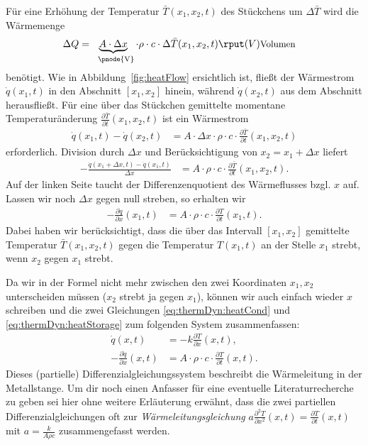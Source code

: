 \documentclass{article}
\def\pdx#1{\frac{\partial #1}{\partial x}}
\def\pdt#1{\frac{\partial #1}{\partial t}}
\begin{document}
Für eine Erhöhung der Temperatur $\bar T(x_1,x_2,t)$ des Stückchens um
$\Delta\bar T$ wird die Wärmemenge
\begin{align*}
  \Delta Q&= \underbrace{A\cdot \Delta x}_{\text{\phantom{V}\pnode{V}}} \cdot \rho\cdot c\cdot \Delta \bar T(x_1,x_2,t)
            \rput(V){\text{\small Volumen}}
\end{align*}
benötigt. Wie in Abbildung~\ref{fig:heatFlow} ersichtlich ist, fließt
der Wärmestrom $\dot q(x_1,t)$ in den Abschnitt $[x_1,x_2]$ hinein,
während $\dot q(x_2,t)$ aus dem Abschnitt herausfließt. Für eine über
das Stückchen gemittelte momentane Temperaturänderung
$\pdt{\bar T}(x_1,x_2,t)$ ist ein Wärmestrom
\begin{align*}
  \dot q(x_1,t) - \dot q(x_2,t) &= A\cdot \Delta x\cdot \rho\cdot c\cdot \pdt{\bar T}(x_1,x_2,t)
\end{align*}
erforderlich. Division durch $\Delta x$ und Berücksichtigung von
$x_2=x_1+\Delta x$ liefert
\begin{align*}
  -\frac{\dot q(x_1+\Delta x,t) - \dot q(x_1,t)}{\Delta x} &= A\cdot \rho\cdot c\cdot \pdt{\bar T}(x_1,x_2,t).
\end{align*}
Auf der linken Seite taucht der Differenzenquotient des Wärmeflusses
bzgl. $x$ auf.  Lassen wir noch $\Delta x$ gegen null streben, so
erhalten wir
\begin{align}
  -\pdx{\dot q}(x_1,t) &= A\cdot \rho \cdot c\cdot \pdt{T}(x_1,t).\label{eq:thermDyn:heatStorage}
\end{align}
Dabei haben wir berücksichtigt, dass die über das Intervall
$[x_1,x_2]$ gemittelte Temperatur $\bar T(x_1,x_2,t)$ gegen die
Temperatur $T(x_1,t)$ an der Stelle $x_1$ strebt, wenn $x_2$ gegen
$x_1$ strebt.

Da wir in der Formel nicht mehr zwischen den zwei Koordinaten
$x_1,x_2$ unterscheiden müssen ($x_2$ strebt ja gegen $x_1$), können
wir auch einfach wieder $x$ schreiben und die zwei Gleichungen
\eqref{eq:thermDyn:heatCond} und \eqref{eq:thermDyn:heatStorage} zum
folgenden System zusammenfassen:
\begin{align*}
  \dot q(x,t) &= -k \pdx{T}(x,t),\\
  -\pdx{\dot q}(x,t) &= A\cdot \rho \cdot c\cdot \pdt{T}(x,t).
\end{align*}
Dieses (partielle) Differenzialgleichungssystem beschreibt die
Wärmeleitung in der Metallstange. Um dir noch einen Anfasser für eine
eventuelle Literaturrecherche zu geben sei hier ohne weitere
Erläuterung erwähnt, dass die zwei partiellen Differenzialgleichungen
oft zur \emph{Wärmeleitungsgleichung}
$a\frac{\partial^2 T}{\partial x^2}(x,t) = \pdt{T}(x,t)$ mit
$a=\frac{k}{A\rho c}$ zusammengefasst werden.
\end{document}
